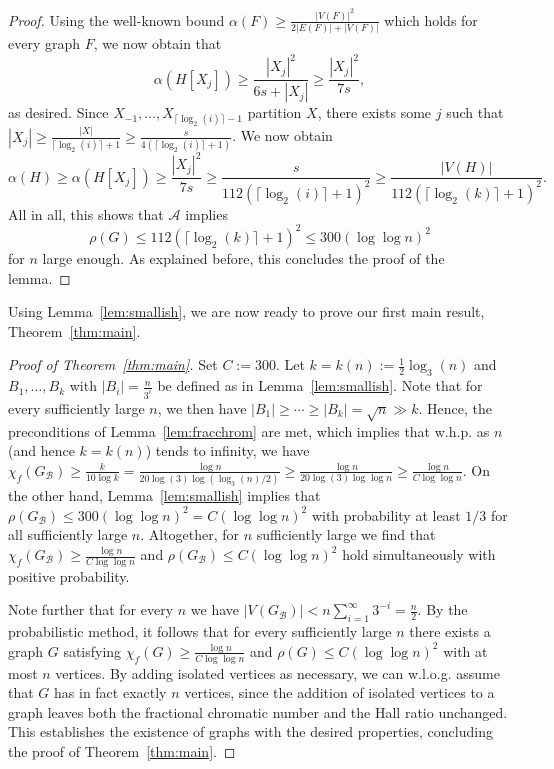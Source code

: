 \documentclass[a4paper,10pt]{amsart}
\begin{document}
\begin{proof}
Using the well-known bound $\alpha(F)\ge \frac{|V(F)|^2}{2|E(F)|+|V(F)|}$ which holds for every graph $F$, we now obtain that
$$\alpha(H[X_j])\ge  \frac{|X_j|^2}{6s+|X_j|}\ge \frac{|X_j|^2}{7s},$$
as desired. Since $X_{-1}, \ldots,X_{\lceil\log_2(i)\rceil-1}$ partition $X$, there exists some $j$ such that $|X_j|\ge \frac{|X|}{\lceil \log_2(i)\rceil+1}\ge \frac{s}{4(\lceil\log_2(i)\rceil+1)}$. We now obtain
$$\alpha(H)\ge \alpha(H[X_j])\ge \frac{|X_j|^2}{7s}\ge \frac{s}{112(\lceil\log_2(i)\rceil+1)^2}\ge \frac{|V(H)|}{112(\lceil\log_2(k)\rceil+1)^2}.$$
 All in all, this shows that $\mathcal{A}$ implies $$\rho(G)\le 112(\lceil\log_2(k)\rceil+1)^2\le 300 (\log \log n)^2$$ for $n$ large enough. As explained before, this concludes the proof of the lemma.
\end{proof}

Using Lemma~\ref{lem:smallish}, we are now ready to prove our first main result, Theorem~\ref{thm:main}. 
\begin{proof}[Proof of Theorem~\ref{thm:main}]
Set $C:=300$. Let $k=k(n):=\frac{1}{2}\log_3(n)$ and $B_1,\ldots,B_k$ with $|B_i|=\frac{n}{3^i}$ be defined as in Lemma~\ref{lem:smallish}. Note that for every sufficiently large $n$, we then have $|B_1|\ge\cdots\ge|B_k|=\sqrt{n}\gg k$. Hence, the preconditions of Lemma~\ref{lem:fracchrom} are met, which implies that w.h.p. as $n$ (and hence $k=k(n)$) tends to infinity, we have $\chi_f(G_{\mathcal{B}})\ge \frac{k}{10\log k}=\frac{\log n}{20\log(3)\log(\log_3(n)/2)}\ge \frac{\log n}{20\log(3)\log \log n}\ge \frac{\log n}{C\log \log n}$. On the other hand, Lemma~\ref{lem:smallish} implies that $\rho(G_{\mathcal{B}})\le 300(\log \log n)^2=C(\log \log n)^2$ with probability at least $1/3$ for all sufficiently large $n$. Altogether, for $n$ sufficiently large we find that $\chi_f(G_{\mathcal{B}})\ge \frac{\log n}{C\log\log n}$ and $\rho(G_{\mathcal{B}})\le C(\log \log n)^2$ hold simultaneously with positive probability. 

Note further that for every $n$ we have $|V(G_{\mathcal{B}})|<n\sum_{i=1}^{\infty}3^{-i}=\frac{n}{2}$. By the probabilistic method, it follows that for every sufficiently large $n$ there exists a graph $G$ satisfying $\chi_f(G)\ge \frac{\log n}{C\log\log n}$ and $\rho(G)\le C(\log \log n)^2$ with at most $n$ vertices. By adding isolated vertices as necessary, we can w.l.o.g. assume that $G$ has in fact exactly $n$ vertices, since the addition of isolated vertices to a graph leaves both the fractional chromatic number and the Hall ratio unchanged. This establishes the existence of graphs with the desired properties, concluding the proof of Theorem~\ref{thm:main}.
\end{proof}
\end{document}
